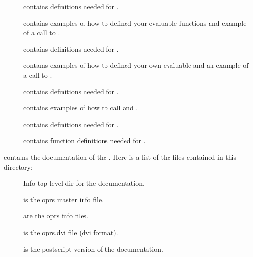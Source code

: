 \begin{description}
\begin{description}
\item [] contains definitions needed for .

\item [] contains examples of how to defined your
evaluable functions and example of a call to .

\item [] contains definitions needed for .

\item [] contains examples of how to defined your own
evaluable  and an example of a call to .

\item [] contains definitions needed for .

\item [] contains examples of how to call
 and .

\item [] contains definitions needed for .

\item [] contains function definitions needed for
.

\end{description}

\item [\file{doc}] contains the documentation of the \COPRSDE{}. Here is a
list of the files contained in this directory:

\begin{description}

\item [] Info top level dir for the documentation.

\item [] is the oprs master info file.

\item [] are the oprs info files.

\item [] is the oprs.dvi file (dvi format).

\item [] is the postscript version of the documentation.


\end{description}
\end{description}
